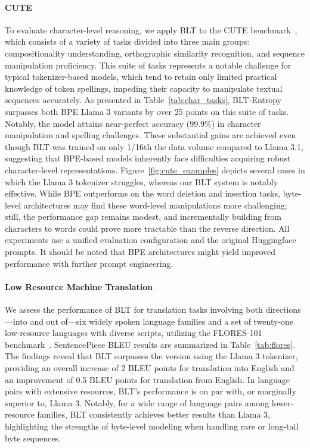 \paragraph{CUTE}
To evaluate character-level reasoning, we apply {\textsc BLT} to the CUTE benchmark~\citep{edman2024cute}, which consists of a variety of tasks divided into three main groups: compositionality understanding, orthographic similarity recognition, and sequence manipulation proficiency. This suite of tasks represents a notable challenge for typical tokenizer-based models, which tend to retain only limited practical knowledge of token spellings, impeding their capacity to manipulate textual sequences accurately. As presented in Table~\ref{tab:char_tasks}, {\textsc BLT}-Entropy surpasses both BPE Llama 3 variants by over 25 points on this suite of tasks. Notably, the model attains near-perfect accuracy (99.9\%) in character manipulation and spelling challenges. These substantial gains are achieved even though {\textsc BLT} was trained on only 1/16th the data volume compared to Llama 3.1, suggesting that BPE-based models inherently face difficulties acquiring robust character-level representations. Figure~\ref{fig:cute_examples} depicts several cases in which the Llama 3 tokenizer struggles, whereas our {\textsc BLT} system is notably effective. While BPE outperforms on the word deletion and insertion tasks, byte-level architectures may find these word-level manipulations more challenging; still, the performance gap remains modest, and incrementally building from characters to words could prove more tractable than the reverse direction. All experiments use a unified evaluation configuration and the original Huggingface prompts. It should be noted that BPE architectures might yield improved performance with further prompt engineering.

\paragraph{Low Resource Machine Translation} We assess the performance of {\textsc BLT} for translation tasks involving both directions—into and out of—six widely spoken language families and a set of twenty-one low-resource languages with diverse scripts, utilizing the FLORES-101 benchmark~\citep{goyal2022flores}. SentencePiece BLEU results are summarized in Table~\ref{tab:flores}. The findings reveal that {\textsc BLT} surpasses the version using the Llama 3 tokenizer, providing an overall increase of 2 BLEU points for translation into English and an improvement of 0.5 BLEU points for translation from English. In language pairs with extensive resources, {\textsc BLT}'s performance is on par with, or marginally superior to, Llama 3. Notably, for a wide range of language pairs among lower-resource families, {\textsc BLT} consistently achieves better results than Llama 3, highlighting the strengths of byte-level modeling when handling rare or long-tail byte sequences.

